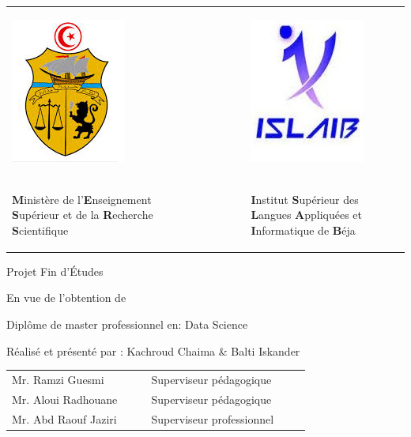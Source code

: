 \begin{titlepage}
  \thispagestyle{empty}
  \begin{table}[t]
    \renewcommand{\arraystretch}{0}
    \begin{tabularx}{\textwidth}
        {p{0.4\linewidth}p{0.2\linewidth}p{0.4\linewidth}}
        \begin{center}
          \includegraphics[scale = .7]
          {figures/00/logo_ministere.png}
        \end{center}
        &
        &
        \begin{center}
          \includegraphics[scale = .75]
          {figures/00/islaib_logo.jpg}
        \end{center}
        \\
        \begin{center}
          {\scriptsize \textbf{M}inistère de l'\textbf{E}nseignement \textbf{S}upérieur 
          et de la \textbf{R}echerche \textbf{S}cientifique}
        \end{center}
        &
        &
        \begin{center}
          {\scriptsize \textbf{I}nstitut \textbf{S}upérieur des \textbf{L}angues
          \textbf{A}ppliquées et \textbf{I}nformatique de \textbf{B}éja}
        \end{center}
        \\
    \end{tabularx}
  \end{table}

  Projet Fin d'\'Etudes

  En vue de l'obtention de

  Diplôme de master professionnel en: 
  Data Science

  Réalisé et présenté par :
  Kachroud Chaima \& Balti Iskander

  \begin{tabular}{p{0.35\linewidth} p{0.4\linewidth}}
    Mr. Ramzi Guesmi & Superviseur pédagogique\\
    Mr. Aloui Radhouane & Superviseur pédagogique\\
    Mr. Abd Raouf Jaziri & Superviseur professionnel\\
  \end{tabular}
\end{titlepage}
